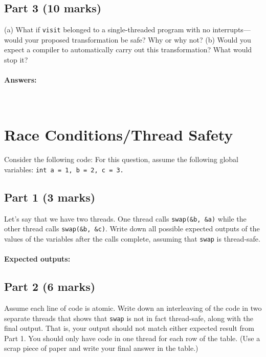 \documentclass[12pt]{article}
\begin{document}
\subsection*{Part 3 (10 marks)}
(a) What if {\tt visit} belonged to a single-threaded program with
no interrupts---would your proposed transformation be safe?
Why or why not? (b) Would you expect a compiler to automatically
carry out this transformation? What would stop it?

\paragraph{Answers:} ~\\[5em]

\section{Race Conditions/Thread Safety}

Consider the following code:
For this question, assume the following global variables: {\tt int a = 1, b = 2, c = 3.}

\subsection*{Part 1 (3 marks)}

Let's say that we have two threads. One thread calls
\verb+swap(&b, &a)+ while the other thread calls \verb+swap(&b, &c)+.
Write down all possible expected outputs of the values of the
variables after the calls complete, assuming that {\tt swap} is
thread-safe.

\paragraph{Expected outputs:}

\newpage
\subsection*{Part 2 (6 marks)}

Assume each line of code is atomic. Write down an interleaving
of the code in two separate threads that shows that {\tt swap}
is not in fact thread-safe, along with the final output. That is,
your output should not match either expected result from Part 1.
You should only have code in one thread for each row of the table.
(Use a scrap piece of paper and write your final answer in the table.)
\end{document}
